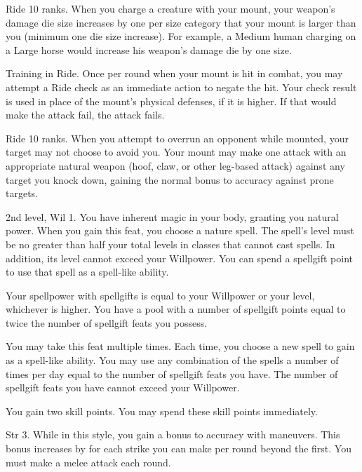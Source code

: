 \featpre Ride 10 ranks.
\featben When you charge a creature with your mount, your weapon's damage die size increases by one per size category that your mount is larger than you (minimum one die size increase).
For example, a Medium human charging on a Large horse would increase his weapon's damage die by one size.

\featpre Training in Ride.
\featben Once per round when your mount is hit in combat, you may attempt a Ride check as an immediate action to negate the hit.
Your check result is used in place of the mount's physical defenses, if it is higher.
If that would make the attack fail, the attack fails.

\featpre Ride 10 ranks.
\featben When you attempt to overrun an opponent while mounted, your target may not choose to avoid you.
Your mount may make one attack with an appropriate natural weapon (hoof, claw, or other leg-based attack) against any target you knock down, gaining the normal  bonus to accuracy against prone targets.

\featpres 2nd level, Wil 1.
\featben You have inherent magic in your body, granting you natural power.
When you gain this feat, you choose a nature spell.
The spell's level must be no greater than half your total levels in classes that cannot cast spells.
In addition, its level cannot exceed your Willpower.
You can spend a spellgift point to use that spell as a spell-like ability.

Your spellpower with spellgifts is equal to your Willpower or your level, whichever is higher.
You have a pool with a number of spellgift points equal to twice the number of spellgift feats you possess.

You may take this feat multiple times.
Each time, you choose a new spell to gain as a spell-like ability.
You may use any combination of the spells a number of times per day equal to the number of spellgift feats you have.
The number of spellgift feats you have cannot exceed your Willpower.

\featben You gain two skill points.
You may spend these skill points immediately.

\featpre Str 3.
\featben While in this style, you gain a  bonus to accuracy with maneuvers.
This bonus increases by  for each strike you can make per round beyond the first.
\stylereq You must make a melee attack each round.

